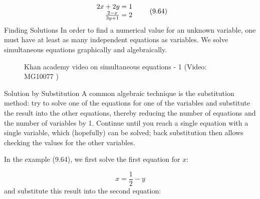    \begin{equation}
    \begin{array}{cc}\hfill 2x+2y=1\\ \hfill \frac{2-x}{3y+1}=2\end{array}\tag{9.64}
      \end{equation}
      \label{m39257*uid93}
            { Finding Solutions}
            \nopagebreak
        \label{m39257*id159052}In order to find a numerical value for an unknown variable, one must have at least as many independent equations as variables. We solve simultaneous equations graphically and algebraically.\par \label{m39257*eip-487}
    \setcounter{subfigure}{0}
	\begin{figure}[H] %
    \textnormal{Khan academy video on simultaneous equations - 1}\vspace{.1in} \nopagebreak
  \label{m39257*yt-media7}\label{m39257*yt-video7}
             { (Video:  MG10077 )}
      \vspace{2pt}
    \vspace{.1in}
 \end{figure}       \par 
 \label{m39257*uid97}
            { Solution by Substitution}
            \nopagebreak
        \label{m39257*id159786}A common algebraic technique is the substitution method: try to solve one of the equations for one of the variables and substitute the result into the other equations, thereby reducing the number of equations and the number of variables by 1. Continue until you reach a single equation with a single variable, which (hopefully) can be solved; back substitution then allows checking the values for the other variables.\par 
        \label{m39257*id159793}In the example (9.64), we first solve the first equation for $x$:\par 
        \label{m39257*id159811}\nopagebreak\noindent{}
          
    \begin{equation}
    x=\frac{1}{2}-y\tag{9.71}
      \end{equation}
        \label{m39257*id159835}and substitute this result into the second equation:\par 
        \label{m39257*id159838}\nopagebreak\noindent{}
          
